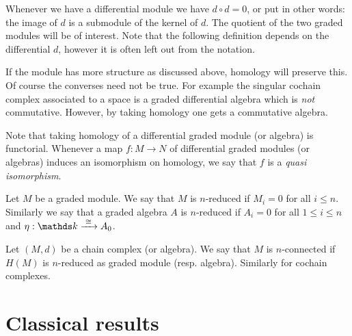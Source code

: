 Whenever we have a differential module we have $d \circ d = 0$, or put in other words: the image of $d$ is a submodule of the kernel of $d$. The quotient of the two graded modules will be of interest. Note that the following definition depends on the differential $d$, however it is often left out from the notation.


If the module has more structure as discussed above, homology will preserve this.
Of course the converses need not be true. For example the singular cochain complex associated to a space is a graded differential algebra which is \emph{not} commutative. However, by taking homology one gets a commutative algebra.

Note that taking homology of a differential graded module (or algebra) is functorial. Whenever a map $f: M \to N$ of differential graded modules (or algebras) induces an isomorphism on homology, we say that $f$ is a \emph{quasi isomorphism}.

\begin{definition}
	Let $M$ be a graded module. We say that $M$ is $n$-reduced if $M_i = 0$ for all $i \leq n$. Similarly we say that a graded algebra $A$ is $n$-reduced if $A_i = 0$ for all $1 \leq i \leq n$ and $\eta: \k \tot{\iso} A_0$.

	Let $(M, d)$ be a chain complex (or algebra). We say that $M$ is $n$-connected if $H(M)$ is $n$-reduced as graded module (resp. algebra). Similarly for cochain complexes.
\end{definition}


\section{Classical results}

